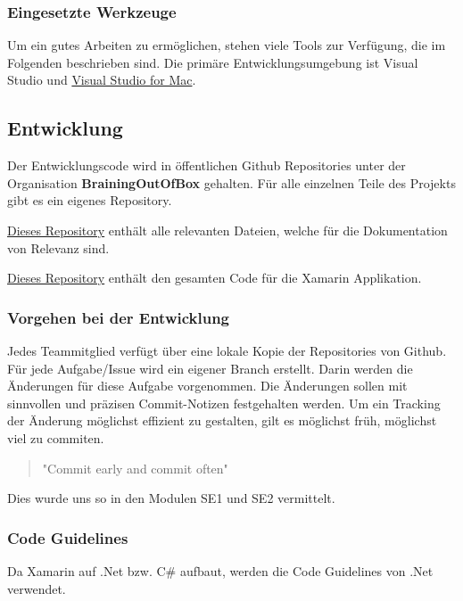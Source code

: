 \subsubsection*{Eingesetzte Werkzeuge}
Um ein gutes Arbeiten zu ermöglichen, stehen viele Tools zur Verfügung, die im Folgenden beschrieben sind. Die primäre Entwicklungsumgebung ist Visual Studio und \href{https://visualstudio.microsoft.com/de/vs/mac/}{Visual Studio for Mac}.

\subsection{Entwicklung}
Der Entwicklungscode wird in öffentlichen Github Repositories unter der Organisation \textbf{BrainingOutOfBox }gehalten. Für alle einzelnen Teile des Projekts gibt es ein eigenes Repository.

\begin{description}[leftmargin=!,labelwidth=2cm]
\item [Doc] \href{https://github.com/BrainingOutOfBox/Doc}{Dieses Repository} enthält alle relevanten Dateien, welche für die Dokumentation von Relevanz sind.
\item [App] \href{https://github.com/BrainingOutOfBox/App}{Dieses Repository} enthält den gesamten Code für die Xamarin Applikation.
\end{description}

\subsubsection*{Vorgehen bei der Entwicklung}
Jedes Teammitglied verfügt über eine lokale Kopie der Repositories von Github. Für jede Aufgabe/Issue wird ein eigener Branch erstellt. Darin werden die Änderungen für diese Aufgabe vorgenommen. Die Änderungen sollen mit sinnvollen und präzisen Commit-Notizen festgehalten werden. Um ein Tracking der Änderung möglichst effizient zu gestalten, gilt es möglichst früh, möglichst viel zu commiten.

\begin{quote}
	"Commit early and commit often"    
\end{quote}

Dies wurde uns so in den Modulen SE1 und SE2 vermittelt.

\subsubsection*{Code Guidelines}
Da Xamarin auf .Net bzw. C\# aufbaut, werden die Code Guidelines von .Net verwendet. \cite{guidelines-DotNet}

